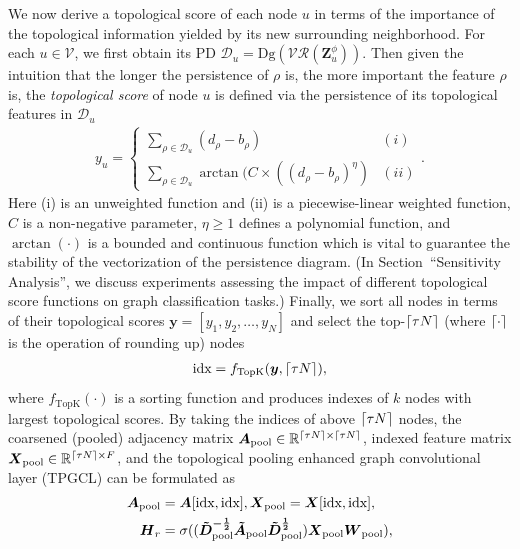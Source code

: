\documentclass[letterpaper]{article} %
\DeclarePairedDelimiter{\ceil}{\lceil}{\rceil}
\begin{document}
We now derive a topological score of each node $u$ in terms of the importance of the topological information yielded by its new surrounding neighborhood. For each $u\in \mathcal{V}$, we first obtain its PD $\mathcal{D}_u=\text{Dg}(\mathcal{VR}(\boldsymbol{Z}^{\phi}_{u}))$. Then given the intuition that the longer the persistence of $\rho$ is, the more important the feature $\rho$ is, the {\it topological score} of node $u$ is defined via the persistence of its topological features in $\mathcal{D}_u$
\begin{align}
\label{weighting_function}
    y_{u} =
    \begin{cases}
    \sum_{\rho \in \mathcal{D}_u}(d_\rho - b_\rho) & (i)\\
    \sum_{\rho \in \mathcal{D}_u}\arctan{(C\times ((d_\rho - b_\rho)^\eta)} & (ii)
    \end{cases}.
\end{align}
Here (i) is an unweighted function and (ii) is a piecewise-linear weighted function, $C$ is a non-negative parameter, $\eta \geq 1$ defines a polynomial function, and $\arctan{(\cdot)}$ is a bounded and continuous function which is vital to guarantee the stability of the vectorization of the persistence diagram. (In Section~``Sensitivity Analysis'', we discuss experiments assessing  the impact of different topological score functions on graph classification tasks.) Finally, we sort all nodes in terms of their topological scores
$\boldsymbol{y} = [y_1, y_2, \dots, y_N]$ and select the top-$\ceil{\tau N}$ (where $\ceil{\cdot}$ is the operation of rounding up) nodes
\begin{align}
    \text{idx} = f_{\text{TopK}}(\boldsymbol{y}, \ceil{\tau N}),
\end{align}
where $f_{\text{TopK}} (\cdot)$ is a sorting function and produces indexes of $k$ nodes with largest topological scores. By taking the indices of above $\ceil{\tau N}$ nodes, the coarsened (pooled) adjacency matrix $\boldsymbol{A}_{\text{pool}} \in \mathbb{R}^{\ceil{\tau N} \times \ceil{\tau N}}$, indexed feature matrix $\boldsymbol{X}_{\text{pool}} \in \mathbb{R}^{\ceil{\tau N} \times F}$, and the topological pooling enhanced graph convolutional layer (TPGCL) can be formulated as
\begin{align}
    \boldsymbol{A}_{\text{pool}} & = \boldsymbol{A}[\text{idx}, \text{idx}], \boldsymbol{X}_{\text{pool}} = \boldsymbol{X}[\text{idx}, \text{idx}],\\
    \boldsymbol{H}_r & = \sigma((\boldsymbol{\Tilde{D}^{-\frac{1}{2}}_{\text{pool}}}\boldsymbol{\Tilde{A}_{\text{pool}}}\boldsymbol{\Tilde{D}^{\frac{1}{2}}_{\text{pool}}})\boldsymbol{X}_{\text{pool}}\boldsymbol{W}_{\text{pool}}),
\end{align}
\end{document}
